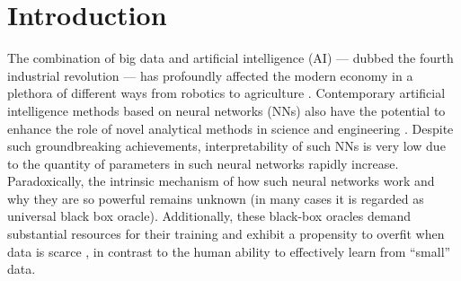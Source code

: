 \documentclass[pra,showkeys,twocolumn,showpacs,aps,10pt]{revtex4-2}
\begin{document}
\maketitle



\section{Introduction}
The combination of big data and artificial intelligence (AI) ---  dubbed the fourth industrial revolution --- has profoundly affected the modern economy in a plethora of different ways from robotics to agriculture \cite{Lecun2015, ghahramani2015,schwab2017,esteva2019, tyrsa2017}.
Contemporary artificial intelligence methods based on neural networks (NNs) also have the potential to enhance the role of novel analytical methods in science and engineering \cite{kaggle2014, radovic2018, butler2018, radovic2018,NobelPrizeChemistry,NobelPrizePhysics}.
Despite such groundbreaking achievements, interpretability of such NNs is very low due to the quantity of parameters in such neural networks rapidly increase.
Paradoxically, the intrinsic mechanism of how such neural networks work and why they are so powerful remains unknown (in many cases it is regarded as universal black box oracle).
Additionally, these black-box oracles demand substantial resources for their training and exhibit a propensity to overfit when data is scarce \cite{sevilla2022compute}, in contrast to the human ability to effectively learn from ``small'' data.

\end{document}
